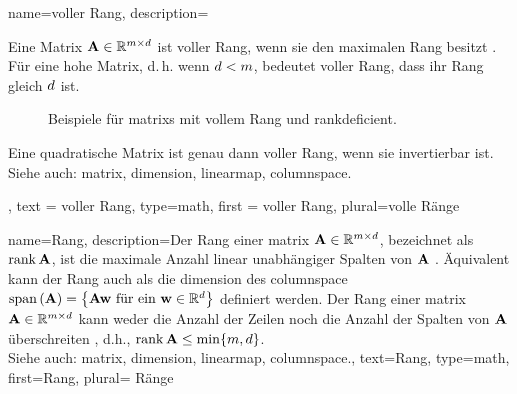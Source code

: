 {
  name={voller Rang},
  description={Eine \gls{Matrix} ${\bf A} \in \mathbb{R}^{m \times d}$ 
  ist  voller Rang, wenn sie den maximalen \gls{Rang} besitzt \cite{StrangLinAlg2016}. 
  Für eine hohe \gls{Matrix}, d.\,h. wenn $d < m$, bedeutet voller Rang, dass ihr \gls{Rang} gleich $d$ ist. 
 \begin{figure}[H]
\centering
{}
\caption{Beispiele für \glspl{matrix} mit vollem Rang und \gls{rankdeficient}.}
\end{figure} 
  Eine quadratische Matrix ist genau dann voller Rang, wenn sie invertierbar ist.\\
  Siehe auch: \gls{matrix}, \gls{dimension}, \gls{linearmap}, \gls{columnspace}.}, 
  text = {voller Rang}, 
  type=math,
  first = {voller Rang},
  plural={volle Ränge}
}

{
  name={Rang},
  description={Der Rang einer \gls{matrix} ${\bf A} \in \mathbb{R}^{m \times d}$, 
  bezeichnet als $\operatorname*{rank}{{\bf A}}$, ist die maximale Anzahl linear unabhängiger Spalten von ${\bf A}$ \cite{StrangLinAlg2016}. 
  Äquivalent kann der Rang auch als die \gls{dimension} des \gls{columnspace} 
  ${\rm span}\left({\bf A} \right) = \big\{ {\bf A} {\bf w} \mbox{ für ein } {\bf w} \in \mathbb{R}^{d} \big\}$ definiert werden. 
  Der Rang einer \gls{matrix} ${\bf A} \in \mathbb{R}^{m \times d}$ 
  kann weder die Anzahl der Zeilen noch die Anzahl der Spalten von ${\bf A}$ überschreiten \cite{Horn91,MeyerMatrixAnalysis}, 
  d.h., $\operatorname*{rank}{{\bf A}} \leq \min \{ m, d \}$. \\
  Siehe auch: \gls{matrix}, \gls{dimension}, \gls{linearmap}, \gls{columnspace}.},
  text={Rang},
  type=math,
  first={Rang},
  plural= {Ränge}
}



